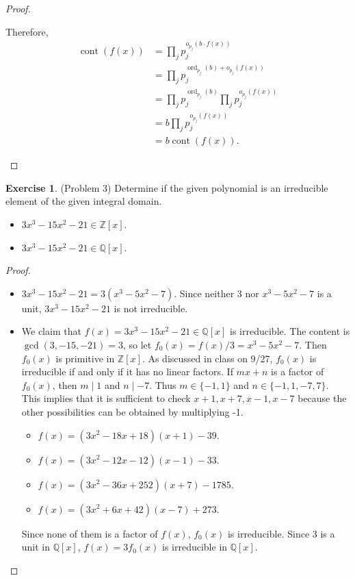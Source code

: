 \documentclass[12pt, psamsfonts]{amsart}
\theoremstyle{definition}
\newtheorem*{exer}{Exercise}
\theoremstyle{remark}
\DeclareMathOperator{\cont}{cont}
\DeclareMathOperator{\ord}{ord}
\numberwithin{equation}{section}
\begin{document}
\begin{proof}
\begin{itemize}
      Therefore, 
      \begin{align*}
        \cont(f(x))
          &= \prod_{j} p_j^{o_{p_j}(b \cdot f(x))} \\
          &= \prod_{j} p_j^{\ord_{p_j}(b) + o_{p_j}(f(x))} \\
          &= \prod_{j} p_j^{\ord_{p_j}(b)} \prod_j p_j^{o_{p_j}(f(x))} \\
          &= b\prod_j p_j^{o_{p_j}(f(x))} \\
          &= b\cont(f(x)).
      \end{align*}
  \end{itemize}
\end{proof}

\begin{exer}{(Problem 3)}
  Determine if the given polynomial is an irreducible element of the given integral domain.
  \begin{itemize}
    \item
      $3x^3 - 15x^2 - 21 \in \mathbb{Z}[x]$.
    \item
      $3x^3 - 15x^2 - 21 \in \mathbb{Q}[x]$.
  \end{itemize}
\end{exer}

\begin{proof}
  $ $
  \begin{itemize}
    \item
      $3x^3 - 15x^2 - 21 = 3(x^3 - 5x^2 - 7)$.
      Since neither 3 nor $x^3 - 5x^2 - 7$ is a unit, $3x^3 - 15x^2 - 21$ is not irreducible.
    \item
      We claim that $f(x) = 3x^3 - 15x^2 - 21 \in \mathbb{Q}[x]$ is irreducible.
      The content is $\gcd(3, -15, -21) = 3$, so let $f_0(x) = f(x) / 3 = x^3 - 5x^2 - 7$.
      Then $f_0(x)$ is primitive in $\mathbb{Z}[x]$.
      As discussed in class on 9/27, $f_0(x)$ is irreducible if and only if it has no linear factors.
      If $mx + n$ is a factor of $f_0(x)$, then $m \mid 1$ and $n \mid -7$.
      Thus $m \in \{ -1, 1 \}$ and $n \in \{ -1, 1, -7, 7 \}$.
      This implies that it is sufficient to check $x + 1, x + 7, x - 1, x - 7$ because the other possibilities can be obtained by multiplying -1.

      \begin{itemize}
        \item
          $f(x) = (3 x^{2} - 18 x + 18)(x + 1) - 39$.
        \item
          $f(x) = (3 x^{2} - 12 x - 12)(x - 1) - 33$.
        \item
          $f(x) = (3 x^{2} - 36 x + 252)(x + 7) - 1785$.
        \item
          $f(x) = (3 x^{2} + 6 x + 42)(x - 7) + 273$.
      \end{itemize}

      Since none of them is a factor of $f(x)$, $f_0(x)$ is irreducible.
      Since $3$ is a unit in $\mathbb{Q}[x]$, $f(x) = 3f_0(x)$ is irreducible in $\mathbb{Q}[x]$.
  \end{itemize}
\end{proof}
\end{document}
